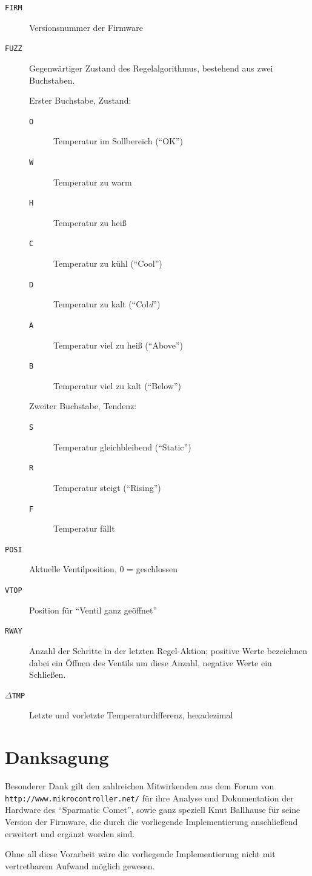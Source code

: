 \documentclass[a5paper]{article}
\newcommand\SC{"`Sparmatic Comet"'}
\begin{document}
\begin{description}
\item[\texttt{FIRM}] Versionsnummer der Firmware
\item[\texttt{FUZZ}] Gegenwärtiger Zustand des Regelalgorithmus,
  bestehend aus zwei Buchstaben.

  Erster Buchstabe, Zustand:
  \begin{description}
  \item[\texttt{O}] Temperatur im Sollbereich ("`OK"')
  \item[\texttt{W}] Temperatur zu warm
  \item[\texttt{H}] Temperatur zu heiß
  \item[\texttt{C}] Temperatur zu kühl ("`Cool"')
  \item[\texttt{D}] Temperatur zu kalt ("`Col\emph{d}"')
  \item[\texttt{A}] Temperatur viel zu heiß ("`Above"')
  \item[\texttt{B}] Temperatur viel zu kalt ("`Below"')
  \end{description}

  Zweiter Buchstabe, Tendenz:
  \begin{description}
  \item[\texttt{S}] Temperatur gleichbleibend ("`Static"')
  \item[\texttt{R}] Temperatur steigt ("`Rising"')
  \item[\texttt{F}] Temperatur fällt
  \end{description}
\item[\texttt{POSI}] Aktuelle Ventilposition, 0 = geschlossen\label{menu:dbg-posi}
\item[\texttt{VTOP}] Position für "`Ventil ganz geöffnet"'
\item[\texttt{RWAY}] Anzahl der Schritte in der letzten Regel-Aktion; positive
  Werte bezeichnen dabei ein Öffnen des Ventils um diese Anzahl, negative
  Werte ein Schließen.
\item[\texttt{$\Delta$TMP}] Letzte und vorletzte Temperaturdifferenz, hexadezimal
\end{description}

\section {
  Danksagung
}

Besonderer Dank gilt den zahlreichen Mitwirkenden aus dem Forum von
\texttt{http://www.mikrocontroller.net/} für ihre Analyse und
Dokumentation der Hardware des \SC, sowie ganz speziell Knut Ballhause
für seine Version der Firmware, die durch die vorliegende
Implementierung anschließend erweitert und ergänzt worden sind.

Ohne all diese Vorarbeit wäre die vorliegende Implementierung nicht
mit vertretbarem Aufwand möglich gewesen.
\end{document}
